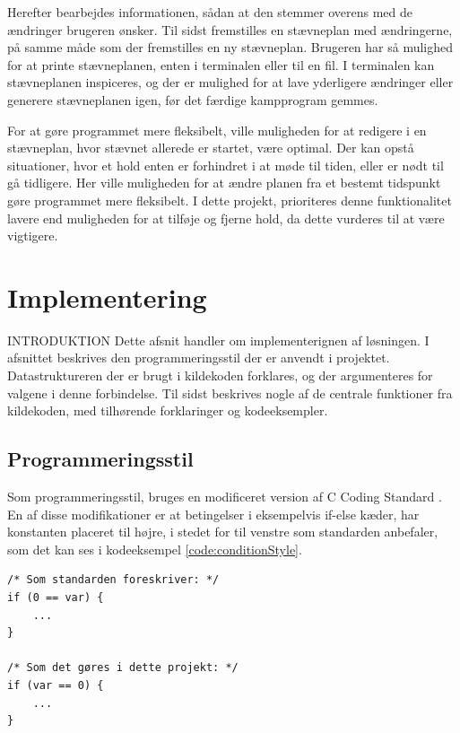 \par
Herefter bearbejdes informationen, sådan at den stemmer overens med de ændringer brugeren ønsker. Til sidst fremstilles en stævneplan med ændringerne, på samme måde som der fremstilles en ny stævneplan. Brugeren har så mulighed for at printe stævneplanen, enten i terminalen eller til en fil. I terminalen kan stævneplanen inspiceres, og der er mulighed for at lave yderligere ændringer eller generere stævneplanen igen, før det færdige kampprogram gemmes.
\par
For at gøre programmet mere fleksibelt, ville muligheden for at redigere i en stævneplan, hvor stævnet allerede er startet, være optimal. Der kan opstå situationer, hvor et hold enten er forhindret i at møde til tiden, eller er nødt til gå tidligere. Her ville muligheden for at ændre planen fra et bestemt tidspunkt gøre programmet mere fleksibelt. I dette projekt, prioriteres denne funktionalitet lavere end muligheden for at tilføje og fjerne hold, da dette vurderes til at være vigtigere.\\


\section{Implementering}\label{implementering}
INTRODUKTION
Dette afsnit handler om implementerignen af løsningen. I afsnittet beskrives den programmeringsstil der er anvendt i projektet. Datastruktureren der er brugt i kildekoden forklares, og der argumenteres for valgene i denne forbindelse. Til sidst beskrives nogle af de centrale funktioner fra kildekoden, med tilhørende forklaringer og kodeeksempler.

\subsection*{Programmeringsstil}
Som programmeringsstil, bruges en modificeret version af C Coding Standard \cite{codingstyle}.
En af disse modifikationer er at betingelser i eksempelvis if-else kæder, har konstanten placeret til højre, i stedet for til venstre som standarden anbefaler, som det kan ses i kodeeksempel  \ref{code:conditionStyle}.
\begin{listing}[H]
\begin{verbatim}
/* Som standarden foreskriver: */
if (0 == var) {
    ...
}

/* Som det gøres i dette projekt: */
if (var == 0) {
    ...
}
\end{verbatim}
\label{code:conditionStyle}
\end{listing}

